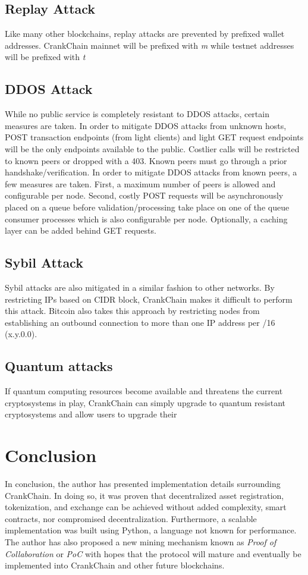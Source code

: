 \documentclass[10pt,twocolumn]{article}
\begin{document}
\subsection{Replay Attack}
Like many other blockchains, replay attacks are prevented by prefixed wallet addresses.  CrankChain mainnet will be prefixed with \textit{m} while testnet addresses will be prefixed with \textit{t}
\subsection{DDOS Attack}
While no public service is completely resistant to DDOS attacks, certain measures are taken.  In order to mitigate DDOS attacks from unknown hosts, POST transaction endpoints (from light clients) and light GET request endpoints will be the only endpoints available to the public.  Costlier calls will be restricted to known peers or dropped with a 403.  Known peers must go through a prior handshake/verification.  In order to mitigate DDOS attacks from known peers, a few measures are taken.  First, a maximum number of peers is allowed and configurable per node.  Second, costly POST requests will be asynchronously placed on a queue before validation/processing take place on one of the queue consumer processes which is also configurable per node.  Optionally, a caching layer can be added behind
GET requests.  
\subsection{Sybil Attack}
Sybil attacks are also mitigated in a similar fashion to other networks.  By restricting IPs based on CIDR block, CrankChain makes it difficult to perform this attack.  Bitcoin also takes this approach by restricting nodes from establishing an outbound connection to more than one IP address per /16 (x.y.0.0).
\subsection{Quantum attacks}
If quantum computing resources become available and threatens the current cryptosystems in play, CrankChain can simply upgrade to quantum resistant cryptosystems and allow users to upgrade their 


\section{Conclusion}
In conclusion, the author has presented implementation details surrounding CrankChain.  In doing so, it was proven that decentralized asset registration, tokenization, and exchange can be achieved without added complexity, smart contracts, nor compromised decentralization.  Furthermore, a scalable implementation was built using Python, a language not known for performance.  \\
The author has also proposed a new mining mechanism known as \textit{Proof of Collaboration} or \textit{PoC} with hopes that the protocol will mature and eventually be implemented into CrankChain and other future blockchains.
\end{document}
